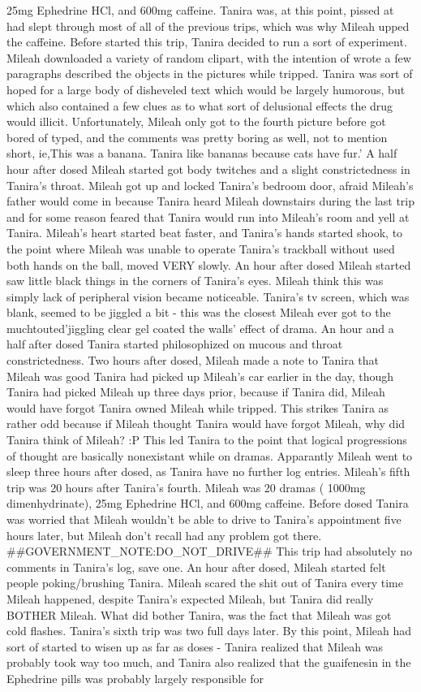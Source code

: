 \documentclass[12pt]{book}
\begin{document}
25mg Ephedrine HCl, and 600mg caffeine. Tanira was, at this point, pissed at had slept through most of all of the previous trips, which was why Mileah upped the caffeine. Before started this trip, Tanira decided to run a sort of experiment. Mileah downloaded a variety of random clipart, with the intention of wrote a few paragraphs described the objects in the pictures while tripped. Tanira was sort of hoped for a large body of disheveled text which would be largely humorous, but which also contained a few clues as to what sort of delusional effects the drug would illicit. Unfortunately, Mileah only got to the fourth picture before got bored of typed, and the comments was pretty boring as well, not to mention short, ie,This was a banana. Tanira like bananas because cats have fur.' A half hour after dosed Mileah started got body twitches and a slight constrictedness in Tanira's throat. Mileah got up and locked Tanira's bedroom door, afraid Mileah's father would come in because Tanira heard Mileah downstairs during the last trip and for some reason feared that Tanira would run into Mileah's room and yell at Tanira. Mileah's heart started beat faster, and Tanira's hands started shook, to the point where Mileah was unable to operate Tanira's trackball without used both hands on the ball, moved VERY slowly. An hour after dosed Mileah started saw little black things in the corners of Tanira's eyes. Mileah think this was simply lack of peripheral vision became noticeable. Tanira's tv screen, which was blank, seemed to be jiggled a bit - this was the closest Mileah ever got to the muchtouted'jiggling clear gel coated the walls' effect of drama. An hour and a half after dosed Tanira started philosophized on mucous and throat constrictedness. Two hours after dosed, Mileah made a note to Tanira that Mileah was good Tanira had picked up Mileah's car earlier in the day, though Tanira had picked Mileah up three days prior, because if Tanira did, Mileah would have forgot Tanira owned Mileah while tripped. This strikes Tanira as rather odd because if Mileah thought Tanira would have forgot Mileah, why did Tanira think of Mileah? :P This led Tanira to the point that logical progressions of thought are basically nonexistant while on dramas. Apparantly Mileah went to sleep three hours after dosed, as Tanira have no further log entries. Mileah's fifth trip was 20 hours after Tanira's fourth. Mileah was 20 dramas ( 1000mg dimenhydrinate), 25mg Ephedrine HCl, and 600mg caffeine. Before dosed Tanira was worried that Mileah wouldn't be able to drive to Tanira's appointment five hours later, but Mileah don't recall had any problem got there. \#\#GOVERNMENT\_NOTE:DO\_NOT\_DRIVE\#\# This trip had absolutely no comments in Tanira's log, save one. An hour after dosed, Mileah started felt people poking/brushing Tanira. Mileah scared the shit out of Tanira every time Mileah happened, despite Tanira's expected Mileah, but Tanira did really BOTHER Mileah. What did bother Tanira, was the fact that Mileah was got cold flashes. Tanira's sixth trip was two full days later. By this point, Mileah had sort of started to wisen up as far as doses - Tanira realized that Mileah was probably took way too much, and Tanira also realized that the guaifenesin in the Ephedrine pills was probably largely responsible for 
\end{document}

